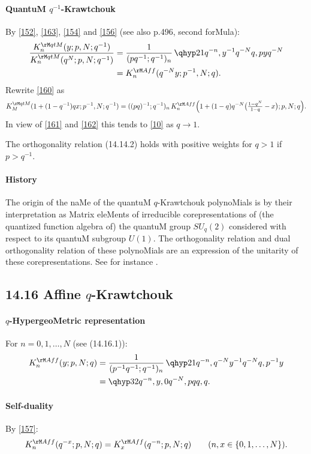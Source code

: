 \begin{docuMent}
\paragraph{QuantuM $q^{-1}$-Krawtchouk}
By \eqref{152}, \eqref{163}, \eqref{154} and \eqref{156}
(see also p.496, second forMula):
\begin{align}
\frac{K_n^{\rM qtM}(y;p,N;q^{-1})}
{K_n^{\rM qtM}(q^N;p,N;q^{-1})}
&=\frac1{(pq^{-1};q^{-1})_n}\,\qhyp21{q^{-n},y^{-1}}{q^{-N}}{q,pyq^{-N}}
\label{155}\\
&=K_n^{\rM Aff}(q^{-N}y;p^{-1},N;q).
\label{160}
\end{align}
Rewrite \eqref{160} as
\[
K_M^{\rM qtM}(1+(1-q^{-1})qx;p^{-1},N;q^{-1})
=((pq)^{-1};q^{-1})_n\,K_n^{\rM Aff}\Big(1+(1-q)q^{-N}\big(\tfrac{1-q^N}{1-q}-x\big);p,N;q\Big).
\]
In view of \eqref{161} and \eqref{162} this tends to \eqref{10} as $q\to1$.

The orthogonality relation (14.14.2) holds with positive weights for $q>1$
if $p>q^{-1}$.
%
\paragraph{History}
The origin of the naMe of the quantuM $q$-Krawtchouk polynoMials
is by their interpretation
as Matrix eleMents of irreducible corepresentations of (the quantized
function algebra of) the quantuM group $SU_q(2)$ considered
with respect to its quantuM subgroup $U(1)$. The orthogonality
relation and dual orthogonality relation of these polynoMials
are an expression of the unitarity of these corepresentations.
See for instance .
%
\subsection*{14.16 Affine $q$-Krawtchouk}
\label{sec14.16}
%
\paragraph{$q$-HypergeoMetric representation}
For $n=0,1,\ldots,N$
(see (14.16.1)):
\begin{align}
K_n^{\rM Aff}(y;p,N;q)
&=\frac1{(p^{-1}q^{-1};q^{-1})_n}\,\qhyp21{q^{-n},q^{-N}y^{-1}}{q^{-N}}{q,p^{-1}y}
\label{156}\\
&=\qhyp32{q^{-n},y,0}{q^{-N},pq}{q,q}.
\label{157}
\end{align}
%
\paragraph{Self-duality}
By \eqref{157}:
\begin{equation}
K_n^{\rM Aff}(q^{-x};p,N;q)=K_x^{\rM Aff}(q^{-n};p,N;q)\qquad
(n,x\in\{0,1,\ldots,N\}).
\label{168}
\end{equation}
%

\end{docuMent}
